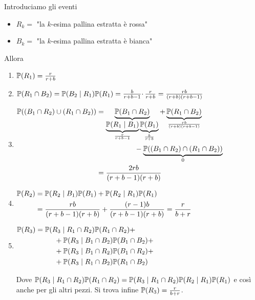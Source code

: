 Introduciamo gli eventi
\begin{itemize}
\item $R_{k} =$ "la $k$-esima pallina estratta è rossa"
\item $B_{k} =$ "la $k$-esima pallina estratta è bianca"
\end{itemize}

Allora
\begin{enumerate}
\item $\mathbb{P}( R_{1}) =\frac{r}{r+b}$
\item $\mathbb{P}( R_{1} \cap B_{2}) =\mathbb{P}( B_{2} \mid R_{1})\mathbb{P}( R_{1}) =\frac{b}{r+b-1} \cdotp \frac{r}{r+b} =\frac{rb}{( r+b)( r+b-1)}$
\item $\begin{aligned}
\mathbb{P}(( B_{1} \cap R_{2}) \cup ( R_{1} \cap B_{2})) & =\underbrace{\mathbb{P}( B_{1} \cap R_{2})}_{\underbrace{\mathbb{P}( R_{1} \mid B_{1})}_{\frac{r}{r+b-1}}\underbrace{\mathbb{P}( B_{1})}_{\frac{b}{r+b}}} +\underbrace{\mathbb{P}( R_{1} \cap B_{2})}_{\frac{rb}{( r+b)( r+b-1)}}\\
 & \ \ \ \ \ \ \ \ \ \ \ \ \ \ \ \ -\underbrace{\mathbb{P}(( B_{1} \cap R_{2}) \cap ( R_{1} \cap B_{2}))}_{0}\\
 & =\frac{2rb}{( r+b-1)( r+b)}
\end{aligned}$
\item $\begin{aligned}
\mathbb{P}( R_{2}) & =\mathbb{P}( R_{2} \mid B_{1})\mathbb{P}( B_{1}) +\mathbb{P}( R_{2} \mid R_{1})\mathbb{P}( R_{1})\\
 & =\frac{rb}{( r+b-1)( r+b)} +\frac{( r-1) b}{( r+b-1)( r+b)} =\frac{r}{b+r}
\end{aligned}$
\item $\begin{aligned}
\mathbb{P}( R_{3}) & =\mathbb{P}( R_{3} \mid R_{1} \cap R_{2})\mathbb{P}( R_{1} \cap R_{2}) +\\
 & \ \ \ \ \ \ \ \ +\mathbb{P}( R_{3} \mid B_{1} \cap B_{2})\mathbb{P}( B_{1} \cap B_{2}) +\\
 & \ \ \ \ \ \ \ \ +\mathbb{P}( R_{3} \mid B_{1} \cap R_{2})\mathbb{P}( B_{1} \cap R_{2}) +\\
 & \ \ \ \ \ \ \ \ +\mathbb{P}( R_{3} \mid R_{1} \cap B_{2})\mathbb{P}( R_{1} \cap B_{2})
\end{aligned}$

Dove $\mathbb{P}( R_{3} \mid R_{1} \cap R_{2})\mathbb{P}( R_{1} \cap R_{2}) =\mathbb{P}( R_{3} \mid R_{1} \cap R_{2})\mathbb{P}( R_{2} \mid R_{1})\mathbb{P}( R_{1})$ e così anche per gli altri pezzi. Si trova infine $\mathbb{P}( R_{3}) =\frac{r}{b+r}$.
\end{enumerate}
\Soluzione
\Soluzione
\Soluzione
\Soluzione
